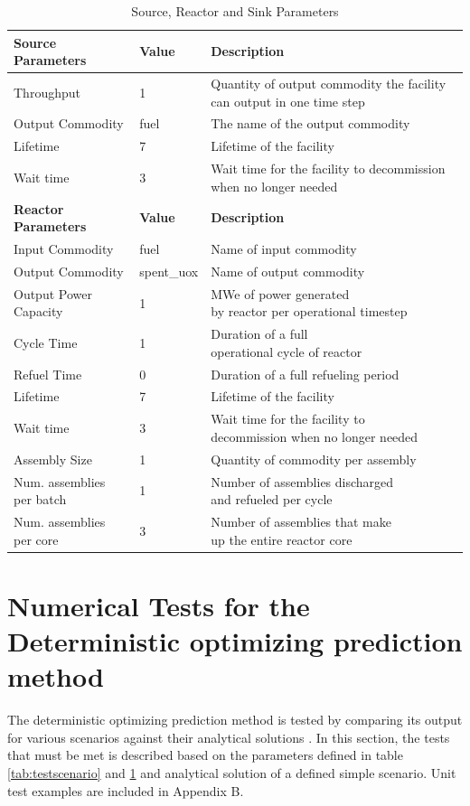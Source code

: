 \documentclass[11pt,letterpaper]{article}
\begin{document}
\begin{table}[H]
	\centering
    \caption {Source, Reactor and Sink Parameters}
	\label{tab:reactor}
	\begin{tabular}{|l|l|l|}
\hline
\textbf{Source Parameters} & \textbf{Value} & \textbf{Description} \\
\hline
Throughput & 1 & Quantity of output commodity the facility can output in one time step \\
Output Commodity & fuel & The name of the output commodity\\
Lifetime & 7 & Lifetime of the facility \\
Wait time & 3 & Wait time for the facility to decommission when no longer needed \\
\hline
\textbf{Reactor Parameters} & \textbf{Value} & \textbf{Description} \\
\hline
Input Commodity & fuel & Name of input commodity\\
Output Commodity & spent\_uox & Name of output commodity\\

Output Power Capacity & 1& \shortstack{MWe of power generated \\by reactor per operational timestep}\\
Cycle Time & 1 & \shortstack{Duration of a full \\ operational cycle of reactor}\\
Refuel Time & 0 & Duration of a full refueling period \\
Lifetime & 7 & Lifetime of the facility \\
Wait time & 3 & \shortstack{Wait time for the facility to\\ decommission when no longer needed} \\
Assembly Size & 1 & Quantity of commodity per assembly \\
Num. assemblies per batch & 1 & \shortstack{Number of assemblies discharged\\ and refueled per cycle}\\
Num. assemblies per core & 3 & \shortstack{Number of assemblies that make\\ up the entire reactor core} \\

\hline
	\end{tabular}
\end{table}

\pagebreak

\section{Numerical Tests for the Deterministic optimizing prediction method}
The deterministic optimizing prediction method is tested by comparing its output for various scenarios against their analytical solutions . In this section, the tests that must be met is described based on the parameters defined in table \ref{tab:testscenario} and \ref{tab:reactor} and analytical solution of a defined simple scenario. Unit test examples are included in Appendix B.
\end{document}
